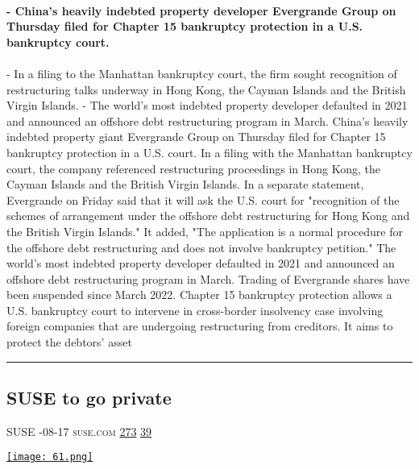 \documentclass[10pt,a4paper]{article}
\begin{document}
\begin{multicols*}{2}
\paragraph{}
\textbf{- China's heavily indebted property developer Evergrande Group on Thursday filed for Chapter 15 bankruptcy protection in a U.S. bankruptcy court.}
\paragraph{}

- In a filing to the Manhattan bankruptcy court, the firm sought recognition of restructuring talks underway in Hong Kong, the Cayman Islands and the British Virgin Islands.
- The world's most indebted property developer defaulted in 2021 and announced an offshore debt restructuring program in March.
China's heavily indebted property giant Evergrande Group on Thursday filed for Chapter 15 bankruptcy protection in a U.S. court.
In a filing with the Manhattan bankruptcy court, the company referenced restructuring proceedings in Hong Kong, the Cayman Islands and the British Virgin Islands.
In a separate statement, Evergrande on Friday said that it will ask the U.S. court for "recognition of the schemes of arrangement under the offshore debt restructuring for Hong Kong and the British Virgin Islands."
It added, "The application is a normal procedure for the offshore debt restructuring and does not involve bankruptcy petition."
The world's most indebted property developer defaulted in 2021 and announced an offshore debt restructuring program in March. Trading of Evergrande shares have been suspended since March 2022.
Chapter 15 bankruptcy protection allows a U.S. bankruptcy court to intervene in cross-border insolvency case involving foreign companies that are undergoing restructuring from creditors. It aims to protect the debtors' asset
\par\noindent\textcolor{red}{\rule{\linewidth}{0.2mm}}
\vfill
\null
\noindent\begin{minipage}{\linewidth}
\subsection{SUSE to go private}
\textsc{\footnotesize
{\scriptsize\faUser}\space 
SUSE 
{\scriptsize\faCalendar}-08-17 
{\scriptsize\faGlobe}\space 
suse.com 
{\scriptsize\faThumbsOUp}\space 
\href{http://news.ycombinator.com/item?id=37166885\&utm\_term=comment}{273} 
{\scriptsize\faComments}\space 
\href{http://news.ycombinator.com/item?id=37166885\&utm\_term=comment}{39} 
}
\par\medskip\noindent
\href{https://www.suse.com/news/EQT-announces-voluntary-public-purchase-offer-and-intention-to-delist-SUSE/?utm\_source=hackernewsletter\&utm\_medium=email\&utm\_term=startup\_news}{
    \texttt{[image: 61.png]}
}
\end{minipage}

\end{multicols*}
\end{document}

